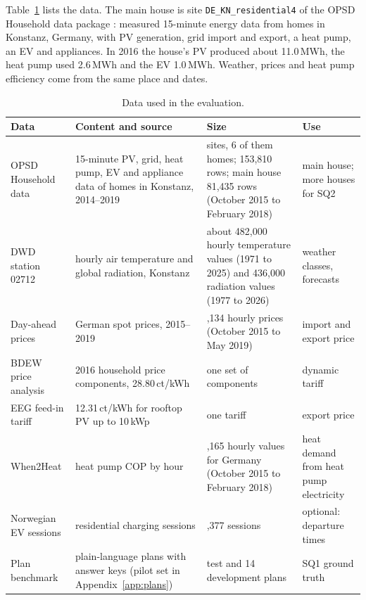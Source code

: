 Table~\ref{tab:data} lists the data. The main house is site
\texttt{DE\_KN\_residential4} of the OPSD Household data package
\parencite{opsd2020}: measured 15-minute energy data from homes in
Konstanz, Germany, with PV generation, grid import and export, a heat
pump, an EV and appliances. In 2016 the house's PV produced about
11.0\,MWh, the heat pump used 2.6\,MWh and the EV 1.0\,MWh. Weather,
prices and heat pump efficiency come from the same place and dates.

\begin{table}[!ht]
\caption{Data used in the evaluation.}
\label{tab:data}
\small
\begin{tabularx}{\textwidth}{@{}>{\raggedright\arraybackslash}p{2.5cm}X>{\raggedright\arraybackslash}p{3.8cm}>{\raggedright\arraybackslash}p{2.6cm}@{}}
\toprule
Data & Content and source & Size & Use \\
\midrule
OPSD Household data & 15-minute PV, grid, heat pump, EV and appliance data of homes in Konstanz, 2014--2019 \parencite{opsd2020} & 11 sites, 6 of them homes; 153,810 rows; main house 81,435 rows (October 2015 to February 2018) & main house; more houses for SQ2 \\DWD station 02712 & hourly air temperature and global radiation, Konstanz \parencite{dwd} & about 482,000 hourly temperature values (1971 to 2025) and 436,000 radiation values (1977 to 2026) & weather classes, forecasts \\Day-ahead prices & German spot prices, 2015--2019 \parencite{energycharts} & 32,134 hourly prices (October 2015 to May 2019) & import and export price \\BDEW price analysis & 2016 household price components, 28.80\,ct/kWh \parencite{bdew2023} & one set of components & dynamic tariff \\EEG feed-in tariff & 12.31\,ct/kWh for rooftop PV up to 10\,kWp \parencite{bnetzaEEG} & one tariff & export price \\When2Heat & heat pump COP by hour \parencite{ruhnau2019,when2heat2023} & 21,165 hourly values for Germany (October 2015 to February 2018) & heat demand from heat pump electricity \\Norwegian EV sessions & residential charging sessions \parencite{sorensen2024} & 35,377 sessions & optional: departure times \\Plan benchmark & plain-language plans with answer keys (pilot set in Appendix~\ref{app:plans}) & 22 test and 14 development plans & SQ1 ground truth \\
\bottomrule
\end{tabularx}
\end{table}


